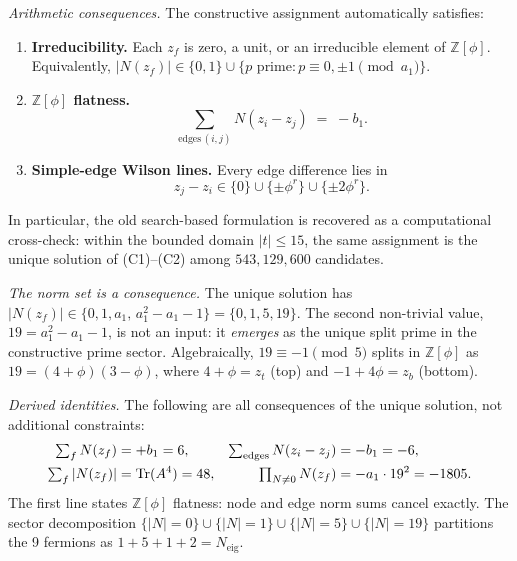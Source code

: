 \documentclass[12pt,a4paper]{article}
\theoremstyle{definition}
\begin{document}
\noindent\textit{Arithmetic consequences.}
The constructive assignment automatically satisfies:
\begin{enumerate}
\item[\textup{(C1)}] \textbf{Irreducibility.} Each $z_f$ is zero, a unit, or an irreducible element of\/ $\mathbb{Z}[\phi]$.
Equivalently, $|N(z_f)| \in \{0, 1\} \cup \{p \text{ prime} : p \equiv 0, \pm 1 \pmod{a_1}\}$.
\item[\textup{(C2)}] \textbf{$\mathbb{Z}[\phi]$ flatness.}
\begin{equation}
\sum_{\text{edges}\,(i,j)} N(z_i - z_j) \;=\; -b_1.
\label{eq:zphi_flatness}
\end{equation}
\item[\textup{(C3)}] \textbf{Simple-edge Wilson lines.}
Every edge difference lies in
\begin{equation}
z_j - z_i \in \{0\} \cup \{\pm \phi^r\} \cup \{\pm 2\phi^r\}.
\end{equation}
\end{enumerate}
In particular, the old search-based formulation is recovered as a computational cross-check: within the bounded domain $|t| \leq 15$, the same assignment is the unique solution of\/ (C1)--(C2) among $543{,}129{,}600$ candidates.

\noindent\textit{The norm set is a consequence.}
The unique solution has $|N(z_f)| \in \{0, 1, a_1, \, a_1^2 - a_1 - 1\} = \{0, 1, 5, 19\}$.
The second non-trivial value, $19 = a_1^2 - a_1 - 1$, is not an input: it \emph{emerges} as the unique split prime in the constructive prime sector.  Algebraically, $19 \equiv -1 \pmod{5}$ splits in $\mathbb{Z}[\phi]$ as $19 = (4 + \phi)(3 - \phi)$, where $4 + \phi = z_t$ (top) and $-1 + 4\phi = z_b$ (bottom).

\noindent\textit{Derived identities.} The following are all consequences of the unique solution, not additional constraints:
\begin{align}
\textstyle\sum_f N(z_f) &= +b_1 = 6, &
\textstyle\sum_{\text{edges}} N(z_i - z_j) &= -b_1 = -6, \label{eq:flatness_identity}\\
\textstyle\sum_f |N(z_f)| &= \operatorname{Tr}(A^4) = 48, &
\textstyle\prod_{N \neq 0} N(z_f) &= -a_1 \cdot 19^2 = -1805. \notag
\end{align}
The first line states $\mathbb{Z}[\phi]$ flatness: node and edge norm sums cancel exactly.
The sector decomposition $\{|N| = 0\} \cup \{|N| = 1\} \cup \{|N| = 5\} \cup \{|N| = 19\}$ partitions the 9 fermions as $1 + 5 + 1 + 2 = N_{\text{eig}}$.
\end{document}
